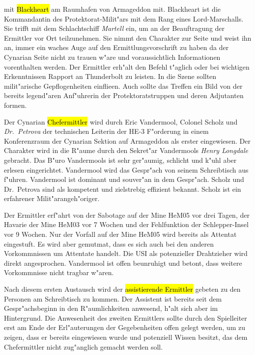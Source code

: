 \begin{description}
		mit \hl{Blackheart} am Raumhafen von Armageddon  mit. Blackheart ist die Kommandantin des Protektorat-Milit"ars mit dem Rang eines Lord-Marschalls. Sie trifft mit dem Schlachtschiff \emph{Martell} ein, um an der Beauftragung der Ermittler vor Ort teilzunehmen. Sie nimmt den Charakter zur Seite und weist ihn an, immer ein waches Auge auf den Ermittlungsvorschrift zu haben da der Cynarian Seite nicht zu trauen w"are und voraussichtlich Informationen vorenthalten werden. Der Ermittler erh"alt den Befehl t"aglich oder bei wichtigen Erkenntnissen Rapport an Thunderbolt zu leisten. In die Szene sollten milit"arische Gepflogenheiten einflie\3en. Auch sollte das Treffen ein Bild von der bereits legend"aren Anf"uhrerin der Protektoratstruppen und deren Adjutanten formen.
\end{description}




Der Cynarian \hl{Chefermittler} wird durch Eric Vandermool, Colonel Scholz und \emph{Dr.~Petrova} der technischen Leiterin der HE-3 F"orderung in einem Konferenzraum der Cynarian Sektion auf Armageddon als erster eingewiesen. Der Charakter wird in die R"aume durch den Sekret"ar Vandermools \emph{Henry Longdale} gebracht. Das B"uro Vandermools ist sehr ger"aumig, schlicht und k"uhl aber erlesen eingerichtet. Vandermool wird das Gespr"ach von seinem Schreibtisch aus f"uhren. Vandermool ist dominant und souver"an in dem Gespr"ach. Scholz und Dr.~Petrova sind als kompetent und zielstrebig effizient bekannt. Scholz ist ein erfahrener Milit"arangeh"origer.

Der Ermittler erf"ahrt von der Sabotage auf der Mine HeM05 vor drei Tagen, der Havarie der Mine HeM03 vor 7 Wochen und der Fehlfunktion der Schlepper-Insel vor 9 Wochen. Nur der Vorfall auf der Mine HeM05 wird bereits als Attentat eingestuft. Es wird aber gemutma\3t, dass es sich auch bei den anderen Vorkommnissen um Attentate handelt. Die USI als potenzieller Drahtzieher wird direkt angesprochen. Vandermool ist offen beunruhigt und betont, dass weitere Vorkommnisse nicht tragbar w"aren. 

Nach diesem ersten Austausch wird der \hl{assistierende Ermittler} gebeten zu den Personen am Schreibtisch zu kommen. Der Assistent ist bereits seit dem Gespr"achsbeginn in den R"aumlichkeiten anwesend, h"alt sich aber im Hintergrund. Die Anwesenheit des zweiten Ermittlers sollte durch den Spielleiter  erst am Ende der Erl"auterungen der Gegebenheiten offen gelegt werden, um zu zeigen, dass er bereits eingewiesen wurde und potenziell Wissen besitzt, das dem Chefermittler nicht zug"anglich gemacht werden soll. 


